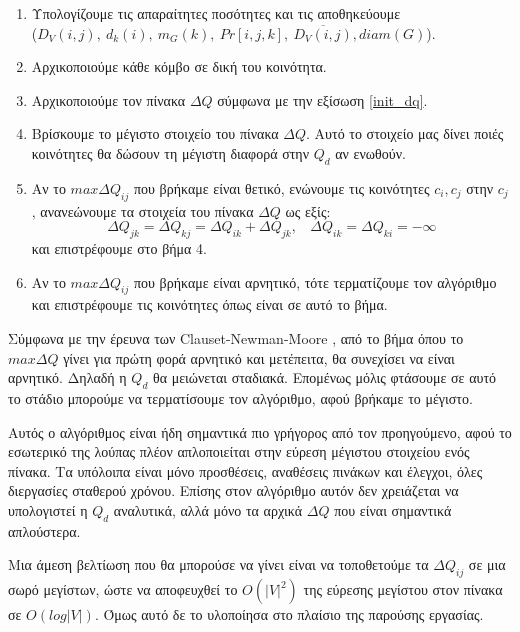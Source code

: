 \documentclass[12pt, letterpaper]{article}
\newcommand{\en}{\selectlanguage{english}}
\newcommand{\gr}{\selectlanguage{greek}}
\begin{document}
\begin{enumerate}
  \item Υπολογίζουμε τις απαραίτητες ποσότητες και τις αποθηκεύουμε \\ ($D_V(i,j), \ d_k(i), \ m_G(k), \ Pr[i,j,k],  \ \overline{D_V(i,j)},diam(G)$). 
  \item Αρχικοποιούμε κάθε κόμβο σε δική του κοινότητα.
  \item Αρχικοποιούμε τον πίνακα $\Delta Q$ σύμφωνα με την εξίσωση \ref{init_dq}. 
  \item Βρίσκουμε το μέγιστο στοιχείο του πίνακα $\Delta Q$. Αυτό το στοιχείο μας 
  δίνει ποιές κοινότητες θα δώσουν τη μέγιστη διαφορά στην $Q_d$ αν ενωθούν.
  \item Αν το $max \Delta Q_{ij}$ που βρήκαμε είναι θετικό, ενώνουμε τις κοινότητες 
  $c_i, c_j$ στην $c_j$, ανανεώνουμε τα στοιχεία του πίνακα $\Delta Q$ ως εξίς:
  \[ \Delta Q_{jk} = \Delta Q_{kj} = \Delta Q_{ik} + \Delta Q_{jk}, \ \ \ \ \Delta Q_{ik} = \Delta Q_{ki} = -\infty \]
  και επιστρέφουμε στο βήμα 4. 
  \item Αν το $max \Delta Q_{ij}$ που βρήκαμε είναι αρνητικό, τότε τερματίζουμε τον αλγόριθμο
  και επιστρέφουμε τις κοινότητες όπως είναι σε αυτό το βήμα. 
\end{enumerate}





Σύμφωνα με την έρευνα των \en Clauset-Newman-Moore \gr \cite{Clauset:fastgreedy},
από το βήμα όπου το $max \Delta Q$ γίνει για πρώτη φορά αρνητικό και μετέπειτα, θα 
συνεχίσει να είναι αρνητικό. Δηλαδή η $Q_d$ θα μειώνεται σταδιακά. Επομένως μόλις φτάσουμε 
σε αυτό το στάδιο μπορούμε να τερματίσουμε τον αλγόριθμο, αφού βρήκαμε το μέγιστο. 

Αυτός ο αλγόριθμος είναι ήδη σημαντικά πιο γρήγορος από τον προηγούμενο, αφού το εσωτερικό 
της λούπας πλέον απλοποιείται στην εύρεση μέγιστου στοιχείου ενός πίνακα. Τα υπόλοιπα είναι 
μόνο προσθέσεις, αναθέσεις πινάκων και έλεγχοι, όλες διεργασίες 
σταθερού χρόνου. Επίσης στον αλγόριθμο αυτόν δεν χρειάζεται να υπολογιστεί η $Q_d$ 
αναλυτικά, αλλά μόνο τα αρχικά $\Delta Q$ που είναι σημαντικά απλούστερα.

Μια άμεση βελτίωση που θα μπορούσε να γίνει \cite{Clauset:fastgreedy} είναι να τοποθετούμε 
τα $\Delta Q_{ij}$ σε μια σωρό μεγίστων, ώστε να αποφευχθεί το $O(|V|^2)$ της εύρεσης 
μεγίστου στον πίνακα σε $O(log|V|)$. Όμως αυτό δε το υλοποίησα στο πλαίσιο της παρούσης 
εργασίας.
\end{document}
